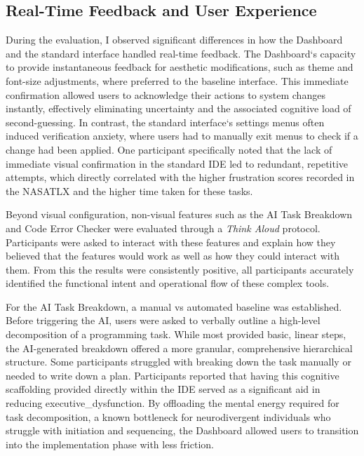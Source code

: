 \subsection{Real-Time Feedback and User Experience}
During the evaluation, I observed significant differences in how the Dashboard and the standard interface handled real-time feedback. The Dashboard`s capacity to provide instantaneous 
feedback for aesthetic modifications, such as theme and font-size adjustments, where preferred to the baseline interface. This immediate confirmation allowed
 users to acknowledge their actions to system changes instantly, effectively eliminating uncertainty and the associated cognitive load of second-guessing. In 
 contrast, the standard interface`s settings menus often induced verification anxiety, where users had to manually exit menus to check if a change had 
 been applied. One participant specifically noted that the lack of immediate visual confirmation in the standard \gls{IDE} led to redundant, repetitive attempts, which 
 directly correlated with the higher frustration scores recorded in the \gls{NASATLX} and the higher time taken for these tasks.

Beyond visual configuration, non-visual features such as the \gls{AI} Task Breakdown and Code Error Checker were evaluated through a \textit{Think Aloud} protocol. Participants 
were asked to interact with these features and explain how they believed that the features would work as well as how they could interact with them. From this the results were consistently positive,
 all participants accurately identified the functional intent and operational flow of these complex tools.

 For the \gls{AI} Task Breakdown, a manual vs automated baseline was established. Before triggering the \gls{AI}, users were asked to verbally outline a high-level 
 decomposition of a programming task. While most provided basic, linear steps, the \gls{AI}-generated breakdown offered a more granular, comprehensive hierarchical 
 structure. Some participants struggled with breaking down the task manually or needed to write down a plan. Participants reported that having this cognitive 
 \gls{scaffolding} provided directly within the \gls{IDE} served as a significant aid in reducing \gls{executive_dysfunction}. By offloading the mental energy required for task 
 decomposition, a known bottleneck for \gls{neurodivergent} individuals who struggle with initiation and sequencing,
 the Dashboard allowed users to transition into the implementation phase with less friction.


